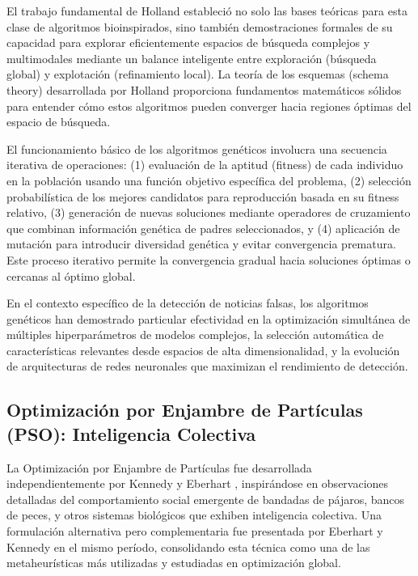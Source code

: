 El trabajo fundamental de Holland estableció no solo las bases teóricas para esta clase de algoritmos bioinspirados, sino también demostraciones formales de su capacidad para explorar eficientemente espacios de búsqueda complejos y multimodales mediante un balance inteligente entre exploración (búsqueda global) y explotación (refinamiento local). La teoría de los esquemas (schema theory) desarrollada por Holland proporciona fundamentos matemáticos sólidos para entender cómo estos algoritmos pueden converger hacia regiones óptimas del espacio de búsqueda.

El funcionamiento básico de los algoritmos genéticos involucra una secuencia iterativa de operaciones: (1) evaluación de la aptitud (fitness) de cada individuo en la población usando una función objetivo específica del problema, (2) selección probabilística de los mejores candidatos para reproducción basada en su fitness relativo, (3) generación de nuevas soluciones mediante operadores de cruzamiento que combinan información genética de padres seleccionados, y (4) aplicación de mutación para introducir diversidad genética y evitar convergencia prematura. Este proceso iterativo permite la convergencia gradual hacia soluciones óptimas o cercanas al óptimo global.

En el contexto específico de la detección de noticias falsas, los algoritmos genéticos han demostrado particular efectividad en la optimización simultánea de múltiples hiperparámetros de modelos complejos, la selección automática de características relevantes desde espacios de alta dimensionalidad, y la evolución de arquitecturas de redes neuronales que maximizan el rendimiento de detección.

\subsection{Optimización por Enjambre de Partículas (PSO): Inteligencia Colectiva}

La Optimización por Enjambre de Partículas fue desarrollada independientemente por Kennedy y Eberhart \cite{kennedy1995particle}, inspirándose en observaciones detalladas del comportamiento social emergente de bandadas de pájaros, bancos de peces, y otros sistemas biológicos que exhiben inteligencia colectiva. Una formulación alternativa pero complementaria fue presentada por Eberhart y Kennedy \cite{eberhart1995particle} en el mismo período, consolidando esta técnica como una de las metaheurísticas más utilizadas y estudiadas en optimización global.


